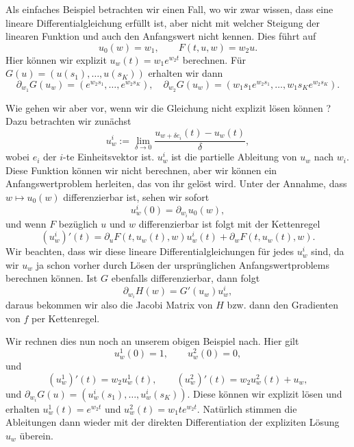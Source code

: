 \begin{example}{}{}
Als einfaches Beispiel betrachten wir einen Fall, wo wir zwar wissen, dass eine lineare Differentialgleichung erfüllt ist, aber nicht mit welcher Steigung der linearen Funktion und auch den Anfangswert nicht kennen. Dies führt auf 
$$ u_0(w) = w_1, \qquad F(t,u,w) = w_2 u. $$
Hier können wir explizit $u_w(t) = w_1 e^{w_2t}$ berechnen. Für $G(u) = (u(s_1), \ldots, u(s_K))$ erhalten wir dann
$$ \partial_{w_1} G(u_w) = (e^{w_2 s_1},\ldots,e^{w_2 s_K}), \quad \partial_{w_2} G(u_w) = (w_1 s_1 e^{w_2 s_1},\ldots,w_1 s_K e^{w_2 s_K}). $$
\end{example}

Wie gehen wir aber vor, wenn wir die Gleichung nicht explizit lösen können ? Dazu betrachten wir zunächst 
$$ u^i_w := \lim_{\delta \rightarrow 0} \frac{u_{w+\delta e_i}(t)- u_w(t)}{\delta}, $$
wobei $e_i$ der $i$-te Einheitsvektor ist. $u^i_w$ ist die partielle Ableitung von $u_w$ nach $w_i$.  Diese Funktion können wir nicht berechnen, aber wir können ein Anfangswertproblem herleiten, das von ihr gelöst wird. Unter der Annahme, dass $w\mapsto u_0(w)$ differenzierbar ist, sehen wir sofort
$$ u_w^i(0) = \partial_{w_i} u_0(w), $$
und wenn $F$ bezüglich $u$ und $w$ differenzierbar ist folgt mit der Kettenregel
$$ (u_w^i)'(t) = \partial_u F(t,u_w(t),w) u_w^i(t) + \partial_w F(t,u_w(t),w). $$
Wir beachten, dass wir diese lineare Differentialgleichungen für jedes $u_w^i$ sind, da wir $u_w$ ja schon vorher durch Lösen der ursprünglichen Anfangswertproblems berechnen können. Ist $G$ ebenfalls differenzierbar, dann folgt
$$ \partial_{w_i} H(w) = G'(u_w) u_w^i, $$
daraus bekommen wir also die Jacobi Matrix von $H$ bzw. dann den Gradienten von $f$ per Kettenregel. 

Wir rechnen dies nun noch an unserem obigen Beispiel nach. Hier gilt 
$$ u_w^1(0) = 1, \qquad u_w^2(0)=0, $$
und
$$ (u_w^1)'(t) = w_2 u_w^1(t), \qquad (u_w^2)'(t) = w_2 u_w^2(t) + u_w, $$
und $\partial_{w_i} G(u) = (u_w^i(s_1),\ldots,u_w^i(s_K))$.
Diese können wir explizit lösen und erhalten $u_w^1(t) = e^{w_2 t}$ und $u_w^2(t) = w_1 t e^{w_2 t}. $
Natürlich stimmen die Ableitungen dann wieder mit der direkten Differentiation der expliziten Lösung $u_w$ überein. 

